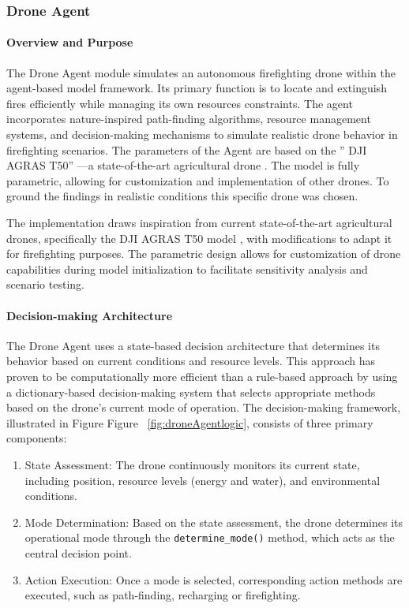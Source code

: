 \documentclass[twoside]{article}
\begin{document}
\subsubsection{Drone Agent}
\label{sec:DroneAgent}

\paragraph{Overview and Purpose} The Drone Agent module simulates an autonomous firefighting drone within the agent-based model framework. Its primary function is to locate and extinguish fires efficiently while managing its own resources constraints. The agent incorporates nature-inspired path-finding algorithms, resource management systems, and decision-making mechanisms to simulate realistic drone behavior in firefighting scenarios.
The parameters of the Agent are based on the '' DJI AGRAS T50'' —a state-of-the-art agricultural drone \citep{DJIAGRAST50}. The model is fully parametric, allowing for customization and implementation of other drones. To ground the findings in realistic conditions this specific drone was chosen.

The implementation draws inspiration from current state-of-the-art agricultural drones, specifically the DJI AGRAS T50 model \citep{DJIAGRAST50}, with modifications to adapt it for firefighting purposes. The parametric design allows for customization of drone capabilities during model initialization to facilitate sensitivity analysis and scenario testing.

\paragraph{Decision-making Architecture} The Drone Agent uses a state-based decision architecture that determines its behavior based on current conditions and resource levels. This approach has proven to be computationally more efficient than a rule-based approach by using a dictionary-based decision-making system that selects appropriate methods based on the drone's current mode of operation.
The decision-making framework, illustrated in Figure Figure ~\ref{fig:droneAgentlogic}, consists of three primary components:
\begin{enumerate}
  \item {State Assessment:} The drone continuously monitors its current state, including position, resource levels (energy and water), and environmental conditions.
  
  \item{Mode Determination:} Based on the state assessment, the drone determines its operational mode through the \texttt{determine\_mode()} method, which acts as the central decision point.
  
  \item {Action Execution:} Once a mode is selected, corresponding action methods are executed, such as path-finding, recharging or firefighting.

\end{enumerate}
\end{document}
